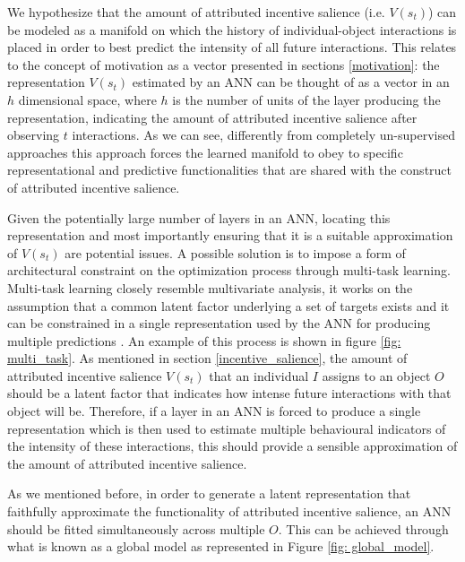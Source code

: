 We hypothesize that the amount of attributed incentive salience (i.e. $V(s_{t})$) can be modeled as a manifold on which the history of individual-object interactions is placed in order to best predict the intensity of all future interactions. This relates to the concept of motivation as a vector presented in sections \ref{motivation}: the representation $V(s_{t})$ estimated by an ANN can be thought of as a vector in an $h$ dimensional space, where $h$ is the number of units of the layer producing the representation, indicating the amount of attributed incentive salience after observing $t$ interactions. As we can see, differently from completely un-supervised approaches this approach forces the learned manifold to obey to specific representational and predictive functionalities that are shared with the construct of attributed incentive salience. 

Given the potentially large number of layers in an ANN, locating this representation and most importantly ensuring that it is a suitable approximation of $V(s_{t})$ are potential issues. A possible solution is to impose a form of architectural constraint on the optimization process through multi-task learning. Multi-task learning closely resemble multivariate analysis, it  works on the assumption that a common latent factor underlying a set of targets exists and it can be constrained in a single representation used by the ANN for producing multiple predictions \cite{bengio2017deep}. An example of this process is shown in figure \ref{fig: multi_task}. As mentioned in section \ref{incentive_salience}, the amount of attributed incentive salience $V(s_t)$ that an individual $I$ assigns to an object $O$ should be a latent factor that indicates how intense future interactions with that object will be. Therefore, if a layer in an ANN is forced to produce a single representation which is then used to estimate multiple behavioural indicators of the intensity of these interactions, this should provide a sensible approximation of the amount of attributed incentive salience. 



As we mentioned before, in order to generate a latent representation that faithfully approximate the functionality of attributed incentive salience, an ANN should be fitted simultaneously across multiple $O$. This can be achieved through what is known as a global model \cite{wang2019deep} as represented in Figure \ref{fig: global_model}.



